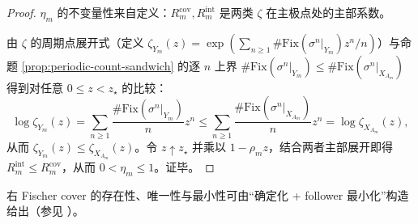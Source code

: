 \begin{proof}
\(\eta_m\) 的不变量性来自定义：\(R_m^{\mathrm{cov}},R_m^{\mathrm{int}}\) 是两类 \(\zeta\) 在主极点处的主部系数。

由 \(\zeta\) 的周期点展开式（定义 \(\zeta_{Y_m}(z)=\exp(\sum_{n\ge 1}\#\mathrm{Fix}(\sigma^n|_{Y_m})z^n/n)\)）与命题 \ref{prop:periodic-count-sandwich} 的逐 \(n\) 上界
\(\#\mathrm{Fix}(\sigma^n|_{Y_m})\le \#\mathrm{Fix}(\sigma^n|_{X_{A_m}})\)
得到对任意 \(0\le z<z_\star\) 的比较：
\[
\log\zeta_{Y_m}(z)
=\sum_{n\ge 1}\frac{\#\mathrm{Fix}(\sigma^n|_{Y_m})}{n}z^n
\le
\sum_{n\ge 1}\frac{\#\mathrm{Fix}(\sigma^n|_{X_{A_m}})}{n}z^n
=\log\zeta_{X_{A_m}}(z),
\]
从而 \(\zeta_{Y_m}(z)\le \zeta_{X_{A_m}}(z)\)。令 \(z\uparrow z_\star\) 并乘以 \(1-\rho_m z\)，结合两者主部展开即得 \(R_m^{\mathrm{int}}\le R_m^{\mathrm{cov}}\)，从而 \(0<\eta_m\le 1\)。证毕。
\end{proof}

右 Fischer cover 的存在性、唯一性与最小性可由“确定化 + follower 最小化”构造给出（参见 \cite{LindMarcus1995,Kitchens1998SymbolicDynamics}）。
